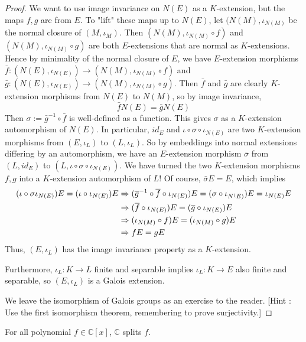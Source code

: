 \documentclass[../book.tex]{subfiles}
\begin{document}
\begin{proof}
        We want to use image invariance on $N(E)$ as a $K$-extension,
        but the maps $f, g$ are from $E$. 
        To "lift" these maps up to $N(E)$, 
        let $(N(M),\iota_{N(M)}$ be the normal closure of $(M,\iota_M)$. 
        Then $(N(M),\iota_{N(M)}\circ f)$ and $(N(M),\iota_{N(M)}\circ g)$
        are both $E$-extensions that are normal as $K$-extensions.
        Hence by minimality of the normal closure of $E$, 
        we have $E$-extension morphisms 
        $\bar{f} : (N(E),\iota_{N(E)}) \to (N(M),\iota_{N(M)}\circ f)$
        and $\bar{g} : (N(E),\iota_{N(E)}) \to (N(M),\iota_{N(M)}\circ g)$.
        Then $\bar{f}$ and $\bar{g}$ are clearly $K$-extension morphisms
        from $N(E)$ to $N(M)$,
        so by image invariance, \[ \bar{f} N(E) = \bar{g} N(E) \]
        Then $\sigma := \bar{g}^{-1} \circ \bar{f}$ is well-defined as a function.
        This gives $\sigma$ as a $K$-extension automorphism of $N(E)$. 
        In particular, $id_E$ and $\iota\circ\sigma\circ\iota_{N(E)}$ 
        are two $K$-extension morphisms from $(E,\iota_L)$ to $(L,\iota_L)$.
        So by embeddings into normal extensions differing by an automorphism, 
        we have an $E$-extension morphism $\bar{\sigma}$
        from $(L,id_E)$ to $(L,\iota\circ\sigma\circ\iota_{N(E)})$.
        We have turned the two $K$-extension morphisms $f, g$ into 
        a $K$-extension automorphism of $L$!
        Of course, $\bar{\sigma} E = E$, which implies \begin{align*}
            (\iota\circ\sigma\iota_{N(E)}) E = (\iota\circ\iota_{N(E)}) E &\Rightarrow
            (\overline{g}^{-1}\circ\overline{f}\circ\iota_{N(E)}) E = (\sigma\circ\iota_{N^(E)})E
                = \iota_{N(E)} E \\
            &\Rightarrow (\overline{f}\circ\iota_{N(E)}) E = (\overline{g}\circ\iota_{N(E)}) E \\
            &\Rightarrow (\iota_{N(M)}\circ f) E = (\iota_{N(M)}\circ g) E \\
            &\Rightarrow f E = g E
        \end{align*}
        Thus, $(E,\iota_L)$ has the image invariance property as a $K$-extension. 
        
        Furthermore, $\iota_L : K \to L$ finite and separable implies 
        $\iota_L : K \to E$ also finite and separable,
        so $(E,\iota_L)$ is a Galois extension. 
        
        We leave the isomorphism of Galois groups as an exercise to the reader. 
        [Hint : Use the first isomorphism theorem, remembering to prove surjectivity.]
\end{proof}
\begin{cor}
For all polynomial $f \in \mathbb{C}[x]$, $\mathbb{C}$ splits $f$.
\end{cor}
\end{document}
